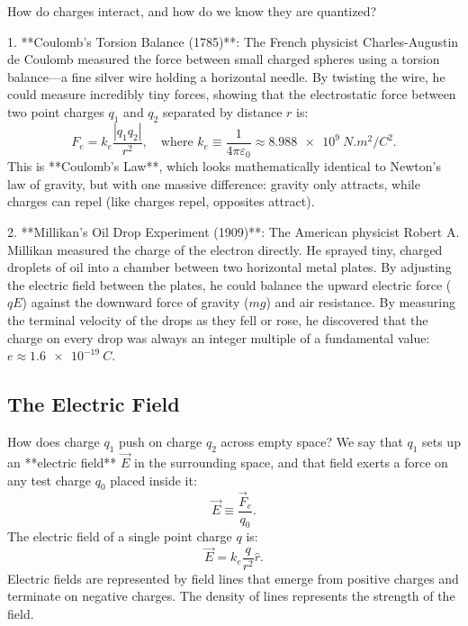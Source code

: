 How do charges interact, and how do we know they are quantized?

1. **Coulomb's Torsion Balance (1785)**: The French physicist Charles-Augustin de Coulomb measured the force between small charged spheres using a torsion balance—a fine silver wire holding a horizontal needle. By twisting the wire, he could measure incredibly tiny forces, showing that the electrostatic force between two point charges $q_1$ and $q_2$ separated by distance $r$ is:
\begin{equation}
    F_e = k_e \frac{|q_1 q_2|}{r^2}, \quad \text{where } k_e \equiv \frac{1}{4\pi\varepsilon_0} \approx \SI{8.988e9}{N.m^2/C^2}.
\end{equation}
This is **Coulomb's Law**, which looks mathematically identical to Newton's law of gravity, but with one massive difference: gravity only attracts, while charges can repel (like charges repel, opposites attract).

2. **Millikan's Oil Drop Experiment (1909)**: The American physicist Robert A. Millikan measured the charge of the electron directly. He sprayed tiny, charged droplets of oil into a chamber between two horizontal metal plates. By adjusting the electric field between the plates, he could balance the upward electric force ($qE$) against the downward force of gravity ($mg$) and air resistance. By measuring the terminal velocity of the drops as they fell or rose, he discovered that the charge on every drop was always an integer multiple of a fundamental value: $e \approx \SI{1.6e-19}{C}$.

\subsection{The Electric Field}

How does charge $q_1$ push on charge $q_2$ across empty space? We say that $q_1$ sets up an **electric field** $\vec{E}$ in the surrounding space, and that field exerts a force on any test charge $q_0$ placed inside it:
\begin{equation}
    \vec{E} \equiv \frac{\vec{F}_e}{q_0}.
\end{equation}
The electric field of a single point charge $q$ is:
\begin{equation}
    \vec{E} = k_e \frac{q}{r^2} \hat{r}.
\end{equation}
Electric fields are represented by field lines that emerge from positive charges and terminate on negative charges. The density of lines represents the strength of the field.

